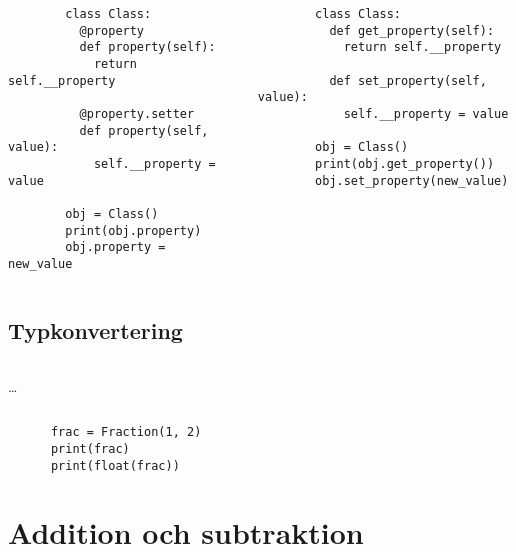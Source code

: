\begin{frame}[fragile]
  \begin{columns}[t]
    \begin{column}{0.5\columnwidth}
      \begin{verbatim}
        class Class:
          @property
          def property(self):
            return self.__property

          @property.setter
          def property(self, value):
            self.__property = value

        obj = Class()
        print(obj.property)
        obj.property = new_value
      \end{verbatim}
    \end{column}
    \begin{column}{0.5\columnwidth}
      \begin{verbatim}
        class Class:
          def get_property(self):
            return self.__property

          def set_property(self, value):
            self.__property = value

        obj = Class()
        print(obj.get_property())
        obj.set_property(new_value)
      \end{verbatim}
    \end{column}
  \end{columns}
\end{frame}

\subsection{Typkonvertering}

\begin{frame}[fragile]
  \inputminted[linenos,firstline=3,lastline=3]{python}{examples/myfrac_base.py}
  \dots
  \inputminted[linenos,autogobble=off,firstline=25,lastline=30]{python}{examples/myfrac_base.py}

  \begin{example}
    \begin{verbatim}
      frac = Fraction(1, 2)
      print(frac)
      print(float(frac))
    \end{verbatim}
  \end{example}
\end{frame}


\section{Addition och subtraktion}

